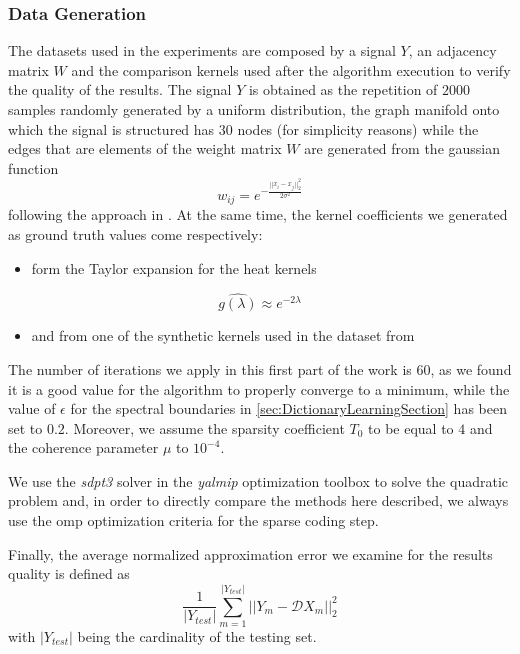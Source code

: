 \subsubsection{Data Generation}
The datasets used in the experiments are composed by a signal $Y$, an adjacency matrix $W$ and the comparison kernels used after the algorithm execution to verify the quality of the results. The signal $Y$ is obtained as the repetition of $2000$ samples randomly generated by a uniform distribution, the graph manifold onto which the signal is structured has $30$ nodes (for simplicity reasons) while the edges that are elements of the weight matrix $W$ are generated from the gaussian function
\begin{equation}
  w_{ij} = e^{-\frac{||x_i - x_j||_2^2}{2\sigma^2}}
\end{equation}
following the approach in \cite{Kalofolias2016}. At the same time, the kernel coefficients we generated as ground truth values come respectively:
\begin{itemize}
  \item form the Taylor expansion for the heat kernels
\end{itemize}
\begin{equation}
  \hat{g(\lambda)} \approx e^{-2\lambda}
\end{equation}
\begin{itemize}
  \item and from one of the synthetic kernels used in the dataset from \cite{Thanou2014}
\end{itemize}

The number of iterations we apply in this first part of the work is $60$, as we found it is a good value for the algorithm to properly converge to a minimum, while the value of $\epsilon$ for the spectral boundaries in \ref{sec:DictionaryLearningSection} has been set to $0.2$. Moreover, we assume the sparsity coefficient $T_0$ to be equal to $4$ and the coherence parameter $\mu$ to $10^{-4}$.

We use the \textit{sdpt3} solver in the \textit{yalmip} optimization toolbox to solve the quadratic problem and, in order to directly compare the methods here described, we always use the \gls{omp} optimization criteria for the sparse coding step.

Finally, the average normalized approximation error we examine for the results quality is defined as 
\begin{equation}
  \frac{1}{|Y_{test}|}\sum_{m=1}^{|Y_{test}|}||Y_m - \mathcal{D}X_m||_2^2
\end{equation}
with $|Y_{test}|$ being the cardinality of the testing set.

